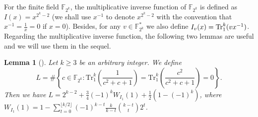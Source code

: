 \documentclass{article}
\newcommand{\F}{\mathbb{F}}
\newcommand{\0}{\textbf{0}}
\newcommand{\1}{\textbf{1}}
\theoremstyle{plain}
\newtheorem{lemma}{Lemma}
\begin{document}
    For the finite field $\F_{2^k}$, the multiplicative inverse function of $\F_{2^k}$ is defined as $I(x)=x^{2^k-2}$ (we shall use $x^{-1}$ to denote $x^{2^k-2}$ with the convention that $x^{-1}=\frac{1}{x}=0$ if $x=0$). 
    Besides, for any $v\in\F_{2^k}^*$ we also define $I_v(x)=\Tr_1^k(vx^{-1})$.
    Regarding the multiplicative inverse function, the following two lemmas are useful and we will use them in the sequel.

    \begin{lemma}[\cite{TangMM2022inversefunction}]\label{L:SumInv00}
        Let $k\geq 3$ be an arbitrary integer.
        We define
        $$L=\#\left\{c\in\F_{2^k}  :  \mathrm{Tr}_1^k\left(\frac{1}{c^2+c+1}\right)=\mathrm{Tr}_1^k\left(\frac{c^2}{c^2+c+1}\right)=0\right\}.$$
        Then we have $L=2^{k-2}+\frac{3}{4}(-1)^kW_{I_1}(1)+\frac{1}{2}\left(1-(-1)^k\right)$, where $W_{I_1}(1)=1-\sum_{t=0}^{\lfloor k/2\rfloor}(-1)^{k-t}\frac{k}{k-t}{{k-t}\choose {t}}2^t$.
    \end{lemma}

\end{document}

